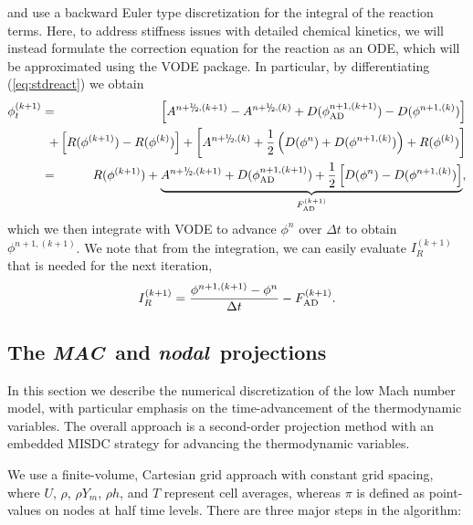 and use a backward Euler type discretization for the integral of the reaction terms.
Here, to address stiffness issues with detailed chemical kinetics, we will instead
formulate the correction equation for the 
reaction as an ODE, which will be approximated using the VODE package.
In particular, by differentiating (\ref{eq:stdreact}) we obtain
\begin{eqnarray}
{\phi}^{(k+1)}_t &=& \left[ A^{n+\myhalf,(k+1)} - A^{n+\myhalf,(k)} + D(\phi_{\rm AD}^{n+1,(k+1)}) - D(\phi^{n+1,(k)}) \right]\nonumber\\
&&\hspace{-0.5cm}+ \left[R(\phi^{(k+1)}) - R(\phi^{(k)})\right] + \left[A^{n+\myhalf,(k)} + \half\left(D(\phi^n) + D(\phi^{n+1,(k)})\right) + R(\phi^{(k)})\right]\nonumber\\
&=& R(\phi^{(k+1)}) + \underbrace{A^{n+\myhalf,(k+1)} + D(\phi_{\rm AD}^{n+1,(k+1)}) + \half\left[D(\phi^n) - D(\phi^{n+1,(k)})\right]}_{F_{\rm AD}^{(k+1)}}, \label{eq:MISDCint}
\end{eqnarray}
which we then integrate with VODE to advance $\phi^n$ over $\Delta t$ to obtain $\phi^{n+1,(k+1)}$.
We note that from the integration, we can easily evaluate
$I_R^{(k+1)}$ that is needed for the next iteration,
\begin{equation}
I_R^{(k+1)} = \frac{\phi^{n+1,(k+1)} - \phi^n}{\Delta t} - F_{\rm AD}^{(k+1)}.
\end{equation}


\subsection{The \textit{MAC}\ and \textit{nodal}\ projections}
In this section we describe the numerical discretization of the low Mach number model, with
particular emphasis on the time-advancement of the thermodynamic variables.  The
overall approach is a second-order projection method with an embedded MISDC
strategy for advancing the thermodynamic variables.  

We use a finite-volume, Cartesian grid approach with constant grid spacing, where
$U$, $\rho$, $\rho Y_m$, $\rho h$, and $T$ represent cell averages,
whereas $\pi$ is defined as point-values on nodes at half 
time levels. There are three major steps in the algorithm:\\

